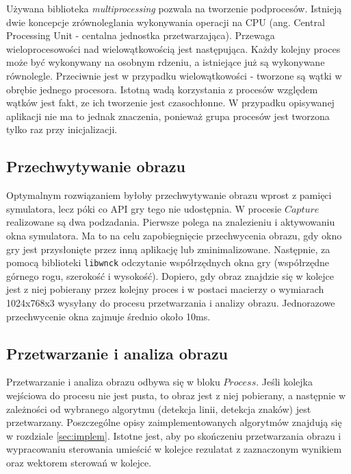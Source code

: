 Używana biblioteka \textit{multiprocessing}\cite{S2} pozwala na tworzenie podprocesów. 
Istnieją dwie koncepcje zrównoleglania wykonywania operacji na CPU (ang. Central Processing Unit - centalna jednostka przetwarzająca). Przewaga wieloprocesowości nad wielowątkowością jest następująca. Każdy kolejny proces może być wykonywany na osobnym rdzeniu, a istniejące już są wykonywane równolegle. Przeciwnie jest w przypadku wielowątkowości - tworzone są wątki w obrębie jednego procesora. Istotną wadą korzystania z procesów względem wątków jest fakt, ze ich tworzenie jest czasochłonne. W przypadku opisywanej aplikacji nie ma to jednak znaczenia, ponieważ grupa procesów jest tworzona tylko raz przy inicjalizacji.

\subsection{Przechwytywanie obrazu}
\label{sec:mechanism}
Optymalnym rozwiązaniem byłoby przechwytywanie obrazu wprost z pamięci symulatora, lecz póki co API gry tego nie udostępnia. %
W procesie $Capture$ realizowane są dwa podzadania. 
Pierwsze polega na znalezieniu i aktywowaniu okna symulatora. 
Ma to na celu zapobiegnięcie przechwycenia obrazu, gdy okno gry jest przysłonięte przez inną aplikację lub zminimalizowane. 
Następnie, za pomocą biblioteki \texttt{libwnck} odczytanie współrzędnych okna gry (współrzędne górnego rogu, szerokość i wysokość). 
Dopiero, gdy obraz znajdzie się w kolejce jest z niej pobierany przez kolejny proces i w postaci macierzy o wymiarach 1024x768x3 wysyłany do procesu przetwarzania i analizy obrazu. %
Jednorazowe przechwycenie okna zajmuje średnio około 10ms.

\subsection{Przetwarzanie i analiza obrazu}
Przetwarzanie i analiza obrazu odbywa się w bloku $Process$.
Jeśli kolejka wejściowa do procesu nie jest pusta, to obraz jest z niej pobierany, a następnie w zależności od wybranego algorytmu (detekcja linii, detekcja znaków) jest przetwarzany. 
Poszczególne opisy zaimplementowanych algorytmów znajdują się w rozdziale \ref{sec:implem}. %
Istotne jest, aby po skończeniu przetwarzania obrazu i wypracowaniu sterowania umieścić w kolejce rezulatat z zaznaczonym wynikiem oraz wektorem sterowań w kolejce. %


